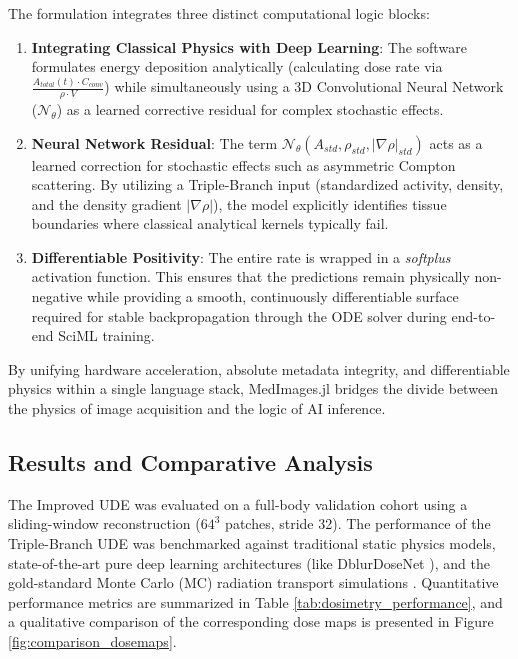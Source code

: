 \documentclass[a4paper,10pt]{elsarticle}
\begin{document}
The formulation integrates three distinct computational logic blocks:
\begin{enumerate}
    \item \textbf{Integrating Classical Physics with Deep Learning}: The software formulates energy deposition analytically (calculating dose rate via $\frac{A_{total}(t) \cdot C_{conv}}{\rho \cdot V}$) while simultaneously using a 3D Convolutional Neural Network ($\mathcal{N}_\theta$) as a learned corrective residual for complex stochastic effects.
    \item \textbf{Neural Network Residual}: The term $\mathcal{N}_\theta(A_{std}, \rho_{std}, |\nabla \rho|_{std})$ acts as a learned correction for stochastic effects such as asymmetric Compton scattering. By utilizing a Triple-Branch input (standardized activity, density, and the density gradient $|\nabla \rho|$), the model explicitly identifies tissue boundaries where classical analytical kernels typically fail.
    \item \textbf{Differentiable Positivity}: The entire rate is wrapped in a \textit{softplus} activation function. This ensures that the predictions remain physically non-negative while providing a smooth, continuously differentiable surface required for stable backpropagation through the ODE solver during end-to-end SciML training.
\end{enumerate}
By unifying hardware acceleration, absolute metadata integrity, and differentiable physics within a single language stack, MedImages.jl bridges the divide between the physics of image acquisition and the logic of AI inference.


\subsection{Results and Comparative Analysis}
The Improved UDE was evaluated on a full-body validation cohort using a sliding-window reconstruction ($64^3$ patches, stride 32). The performance of the Triple-Branch UDE was benchmarked against traditional static physics models, state-of-the-art pure deep learning architectures (like DblurDoseNet  \cite{LiFessler2021}), and the gold-standard Monte Carlo (MC) radiation transport simulations  \cite{VolpePiscopo2023}. Quantitative performance metrics are summarized in Table \ref{tab:dosimetry_performance}, and a qualitative comparison of the corresponding dose maps is presented in Figure \ref{fig:comparison_dosemaps}.
\end{document}
